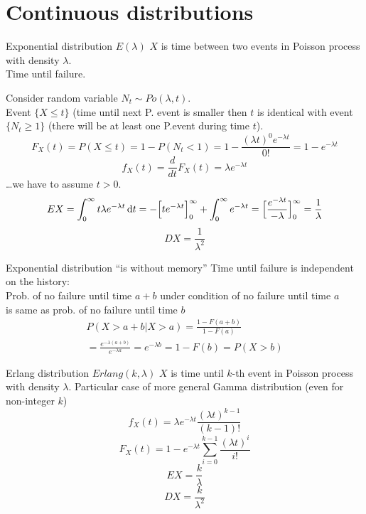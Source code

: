 \documentclass[smaller]{beamer}
\def\d{\,{\rm d}}               %
\def\blue#1{{\usebeamercolor[fg]{my blue} #1}}
\begin{document}
\section{Continuous distributions}

\begin{frame}{Exponential distribution $E(\lambda)$}
$X$ is time between two events in Poisson process with density $\lambda$.\\
Time until failure.

\vspace{2ex}
Consider random variable $N_t \sim Po(\lambda, t)$.\\
Event $\{X \le t\}$ (time until next P. event is smaller then $t$ 
is identical with event $\{N_t \ge 1\}$ (there will be at least one P.event during time $t$).\\
\[
 F_X(t)=P(X\le t) = 1 - P(N_t < 1) = 1 - \frac{(\lambda t)^0 e^{-\lambda t}}{0!} = 1 - e^{-\lambda t}
\]
\[
  f_X(t) = \frac{d}{dt} F_X(t) = \lambda e^{-\lambda t}
\]
\dots we have to assume $t>0$.
\[
 EX = \int_0^\infty t\lambda e^{-\lambda t} \d t 
 = -\Big[te^{-\lambda t}\Big]_0^{\infty} + \int_0^\infty e^{-\lambda t}
 = \Big[\frac{e^{-\lambda t}}{-\lambda}\Big]_0^\infty=\frac{1}{\lambda}
\]
\[
 DX = \frac{1}{\lambda^2}
\]
\end{frame}

\begin{frame}{Exponential distribution ``is without memory''}
Time until failure is independent on the history:\\
Prob. of no failure until time $a+b$ under condition of no failure until time $a$\\
is same as prob. of no failure until time $b$
\begin{multline*}
 P(X > a+b | X>a) = \frac{1-F(a+b)}{1-F(a)} \\
= \frac{e^{-\lambda(a+b)}}{e^{-\lambda a}}= e^{-\lambda b} = 1 - F(b) = P(X>b)
\end{multline*}

\end{frame}


\begin{frame}{Erlang distribution $Erlang(k,\lambda)$}
$X$ is time until $k$-th event in Poisson process with density $\lambda$. 
Particular case of more general \blue{Gamma distribution} (even for non-integer $k$)
\[
 f_X(t)=\lambda e^{-\lambda t} \frac{(\lambda t)^{k-1}}{(k-1)!}
\]
\[
  F_X(t) = 1- e^{-\lambda t}\sum_{i=0}^{k-1} \frac{(\lambda t)^{i}}{i!}
\]
\[
 EX = \frac{k}{\lambda}
\]
\[
 DX = \frac{k}{\lambda^2}
\]

\end{frame}
\end{document}
